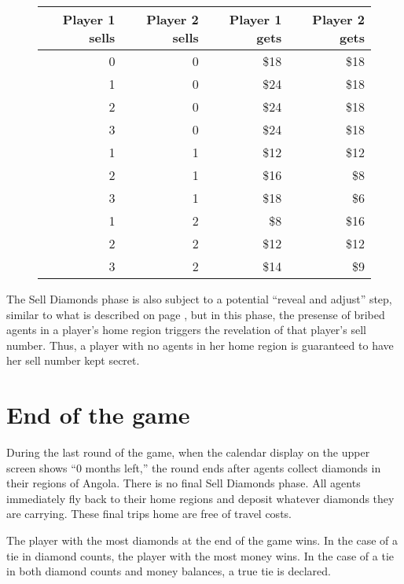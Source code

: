 \documentclass[8pt]{extbook}
\begin{document}
\begin{figure}[t]
\begin{center}
\begin{tabular}{r|r||r|r}
Player 1 sells & Player 2 sells & Player 1 gets & Player 2 gets\\
\hline
\hline
0 & 0 & \$18 & \$18 \\
\hline
1 & 0 & \$24 & \$18 \\
2 & 0 & \$24 & \$18 \\
3 & 0 & \$24 & \$18 \\
\hline
1 & 1 & \$12 & \$12 \\
2 & 1 & \$16 & \$8 \\
3 & 1 & \$18 & \$6 \\
\hline
1 & 2 & \$8 & \$16 \\
2 & 2 & \$12 & \$12 \\
3 & 2 & \$14 & \$9 \\
\end{tabular} 
\end{center}
\label{fig:sellTable}

\end{figure}

The Sell Diamonds phase is also subject to a potential ``reveal and adjust'' step, similar to what is described on page \pageref{sec:movesRevealed}, but in this phase, the presense of bribed agents in a player's home region triggers the revelation of that player's sell number.  Thus, a player with no agents in her home region is guaranteed to have her sell number kept secret.


\section{End of the game}

During the last round of the game, when the calendar display on the upper screen shows ``0 months left,'' the round ends after agents collect diamonds in their regions of Angola.  There is no final Sell Diamonds phase.  All agents immediately fly back to their home regions and deposit whatever diamonds they are carrying.  These final trips home are free of travel costs.

The player with the most diamonds at the end of the game wins.  In the case of a tie in diamond counts, the player with the most money wins.  In the case of a tie in both diamond counts and money balances, a true tie is declared.
\end{document}
